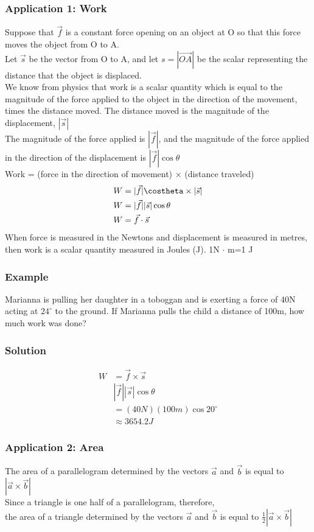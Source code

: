 \documentclass{article}
\begin{document}
\subsubsection{Application 1: Work}
Suppose that $\vec{f}$ is a constant force opening on an object at O so that this force moves the object from O to A.\\
Let $\vec{s}$ be the vector from O to A, and let $s=|\overrightarrow{OA}|$ be the scalar representing the distance that the object is displaced.\\
We know from physics that work is a scalar quantity which is equal to the magnitude of the force applied to the object in the direction of the movement, times the distance moved. The distance moved is the magnitude of the displacement, $|\vec{s}|$\\
The magnitude of the force applied is $|\vec{f}|$, and the magnitude of the force applied in the direction of the displacement is $|\vec{f}|\cos\theta$\\
Work = (force in the direction of movement) $\times$ (distance traveled)\\
\begin{align*}
    W&=|\vec{f}| \costheta \times |\vec{s}|\\
    W&=|\vec{f}| |\vec{s}| \cos \theta\\
    W&=\vec{f} \cdot \vec{s}
\end{align*}
When force is measured in the Newtons and displacement is measured in metres, then work is a scalar quantity measured in Joules (J). 1N $\cdot$ m=1 J

\subsubsection*{Example}
Marianna is pulling her daughter in a toboggan and is exerting a force of 40N acting at $24^{\circ}$ to the ground. If Marianna pulls the child a distance of 100m, how much work was done?
 \subsubsection*{Solution}
 \begin{align*}
    W&=\vec{f} \times \vec{s}\\
    &|\vec{f}||\vec{s}| \cos \theta\\
    &=(40N)(100m) \cos 20^{\circ}\\
    &\approx 3654.2 J
 \end{align*}

 \subsubsection{Application 2: Area}
 The area of a parallelogram determined by the vectors $\vec{a}$ and $\vec{b}$ is equal to $|\vec{a} \times \vec{b}|$\\
 Since a triangle is one half of a parallelogram, therefore,\\
 the area of a triangle determined by the vectors $\vec{a}$ and $\vec{b}$ is equal to $\frac{1}{2}|\vec{a}\times \vec{b}|$
\end{document}
